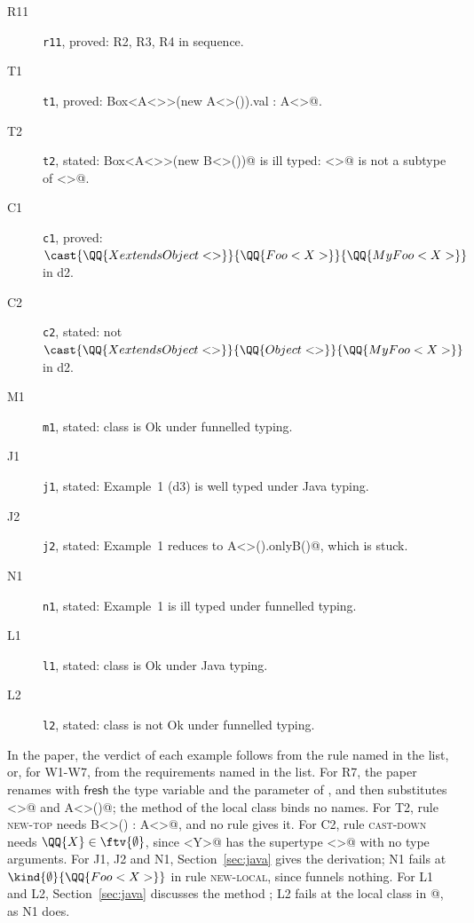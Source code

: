 \begin{description}
\item[R11] \texttt{r11}, proved: R2, R3, R4 in sequence.
\item[T1] \texttt{t1}, proved: \Q@new Box<A<>>(new A<>()).val : A<>@.
\item[T2] \texttt{t2}, stated: \Q@new Box<A<>>(new B<>())@ is ill typed: \Q@B<>@ is not a subtype of \Q@A<>@.
\item[C1] \texttt{c1}, proved: $\cast{\QQ{X extends Object<>}}{\QQ{Foo<X>}}{\QQ{MyFoo<X>}}$ in d2.
\item[C2] \texttt{c2}, stated: not $\cast{\QQ{X extends Object<>}}{\QQ{Object<>}}{\QQ{MyFoo<X>}}$ in d2.
\item[M1] \texttt{m1}, stated: class \Q@Maker@ is Ok under funnelled typing.
\item[J1] \texttt{j1}, stated: Example~1 (d3) is well typed under Java typing.
\item[J2] \texttt{j2}, stated: Example~1 reduces to \Q@new A<>().onlyB()@, which is stuck.
\item[N1] \texttt{n1}, stated: Example~1 is ill typed under funnelled typing.
\item[L1] \texttt{l1}, stated: class \Q@Leaker@ is Ok under Java typing.
\item[L2] \texttt{l2}, stated: class \Q@Leaker@ is not Ok under funnelled typing.
\end{description}
\smallskip

\noindent In the paper, the verdict of each example follows from the rule named in the list, or, for W1-W7, from the requirements named in the list.
For R7, the paper renames with $\mathsf{fresh}$ the type variable \Q@Y@ and the parameter \Q@y@ of \Q@mk@, and then substitutes \Q@A<>@ and \Q@new A<>()@; the method \Q@x@ of the local class binds no names.
For T2, rule \textsc{new-top} needs \Q@new B<>() : A<>@, and no rule gives it.
For C2, rule \textsc{cast-down} needs $\QQ{X}\in\ftv{\emptyset}$, since \Q@MyFoo<Y>@ has the supertype \Q@Object<>@ with no type arguments.
For J1, J2 and N1, Section~\ref{sec:java} gives the derivation; N1 fails at $\kind{\emptyset}{\QQ{Foo<X>}}$ in rule \textsc{new-local}, since \Q@MyFoo@ funnels nothing.
For L1 and L2, Section~\ref{sec:java} discusses the method \Q@leak@; L2 fails at the local class in @, as N1 does.
